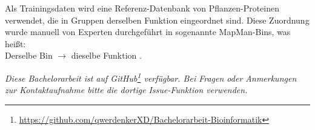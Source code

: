     Als Trainingsdaten wird eine Referenz-Datenbank von Pflanzen-Proteinen verwendet, die in Gruppen derselben Funktion eingeordnet sind. Diese Zuordnung wurde manuell von Experten durchgeführt in sogenannte MapMan-Bins, was heißt:\\Derselbe Bin $\rightarrow$ dieselbe Funktion \cite{mapman}.

    \textit{Diese Bachelorarbeit ist auf GitHub\footnote{\url{https://github.com/qwerdenkerXD/Bachelorarbeit-Bioinformatik}} verfügbar. Bei Fragen oder Anmerkungen zur Kontaktaufnahme bitte die dortige Issue-Funktion verwenden.}
